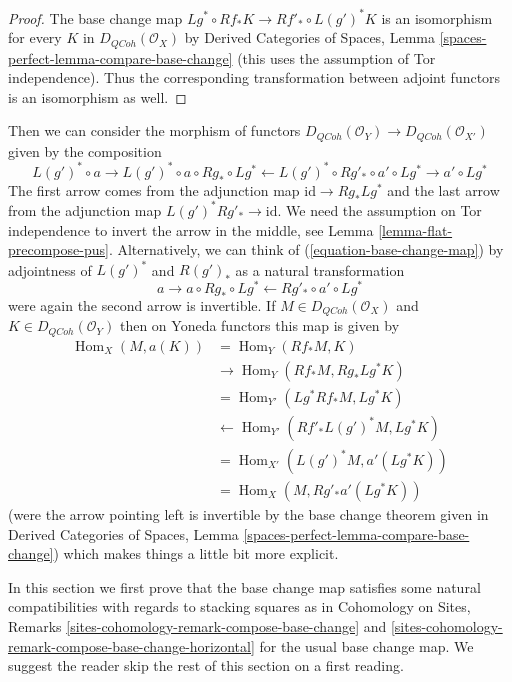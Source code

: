 \documentclass{stacks-project}
\theoremstyle{plain}
\theoremstyle{definition}
\theoremstyle{remark}
\numberwithin{equation}{subsection}
\def\Hom{\mathop{\mathrm{Hom}}\nolimits}
\def\QCoh{\mathit{QCoh}}
\begin{document}
\begin{proof}
The base change map $Lg^* \circ Rf_* K \to Rf'_* \circ L(g')^*K$
is an isomorphism for every $K$ in $D_\QCoh(\mathcal{O}_X)$ by
Derived Categories of Spaces, Lemma
\ref{spaces-perfect-lemma-compare-base-change}
(this uses the assumption of Tor independence).
Thus the corresponding transformation between adjoint functors
is an isomorphism as well.
\end{proof}

\noindent
Then we can consider the
morphism of functors
$D_\QCoh(\mathcal{O}_Y) \to D_\QCoh(\mathcal{O}_{X'})$
given by the composition
\begin{equation}
\label{equation-base-change-map}
L(g')^* \circ a \to
L(g')^* \circ a \circ Rg_* \circ Lg^* \leftarrow
L(g')^* \circ Rg'_* \circ a' \circ Lg^* \to a' \circ Lg^*
\end{equation}
The first arrow comes from the adjunction map $\text{id} \to Rg_* Lg^*$
and the last arrow from the adjunction map $L(g')^*Rg'_* \to \text{id}$.
We need the assumption on Tor independence to invert the arrow
in the middle, see Lemma \ref{lemma-flat-precompose-pus}.
Alternatively, we can think of (\ref{equation-base-change-map}) by
adjointness of $L(g')^*$ and $R(g')_*$ as a natural transformation
$$
a \to a \circ Rg_* \circ Lg^* \leftarrow Rg'_* \circ a' \circ Lg^*
$$
were again the second arrow is invertible. If $M \in D_\QCoh(\mathcal{O}_X)$
and $K \in D_\QCoh(\mathcal{O}_Y)$
then on Yoneda functors this map is given by
\begin{align*}
\Hom_X(M, a(K))
& =
\Hom_Y(Rf_*M, K) \\
& \to
\Hom_Y(Rf_*M, Rg_* Lg^*K) \\
& =
\Hom_{Y'}(Lg^*Rf_*M, Lg^*K) \\
& \leftarrow
\Hom_{Y'}(Rf'_* L(g')^*M, Lg^*K) \\
& =
\Hom_{X'}(L(g')^*M, a'(Lg^*K)) \\
& =
\Hom_X(M, Rg'_*a'(Lg^*K))
\end{align*}
(were the arrow pointing left is invertible by the base
change theorem given in
Derived Categories of Spaces, Lemma
\ref{spaces-perfect-lemma-compare-base-change})
which makes things a little bit more explicit.

\medskip\noindent
In this section we first prove that the base change map satisfies
some natural compatibilities with regards to stacking squares as in
Cohomology on Sites, Remarks
\ref{sites-cohomology-remark-compose-base-change} and
\ref{sites-cohomology-remark-compose-base-change-horizontal}
for the usual base change map.
We suggest the reader skip the rest of this section on a first reading.
\end{document}
